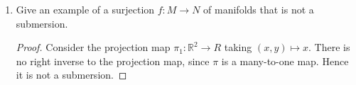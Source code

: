 \documentclass{article}
\begin{document}
\begin{enumerate}
\begin{proof}
		Since we are working in $\mathbb{R}^2$, then $x^1 =x$ and $x^2=y$. Define $X:= x \frac{\partial}{\partial x} + y \frac{\partial}{\partial y}$
		so $X^1 = x$ and $X^2 = y$. Similarly $Y:= y \frac{\partial}{\partial x} - x \frac{\partial}{\partial y}$ has $Y^1 = y$ and $Y^2 = -x$.
		So applying the formula for the Lie bracket, we get
		that the term in front of $\partial / \partial x$ should be
		\[ \left (x \frac{\partial y}{\partial x} - y \frac{\partial x}{\partial x} \right ) + \left (y \frac{\partial y}{\partial y} + x \frac{\partial x}{\partial y} \right)  \]	
		which simplifies to 
		\[ 0 - y + y +0 = 0 \]
		and the term in front of $\partial /\partial y$ should be
		\[  \left ( x\frac{\partial (-x)}{\partial x} - y \frac{\partial y}{\partial x} \right ) +  \left ( y \frac{\partial (-x)}{\partial y} + x \frac{\partial y}{\partial y} \right )  \]
		which simplifies to 
		\[ -x - 0 + 0 + x = 0.\]
		Thus
		\[ [X,Y] = 0 .\]
%
	\end{proof}
	
	\item Give an example of a surjection $f: M \rightarrow N$ of manifolds that is not a submersion.
	\begin{proof}
		Consider the projection map $\pi_1: \mathbb{R}^2 \rightarrow R$ taking $(x,y) \mapsto x$. There is no right inverse to the projection map, since $\pi$ is a many-to-one map. Hence it is not a submersion.
	\end{proof}
	 
\end{enumerate}
\end{document}

